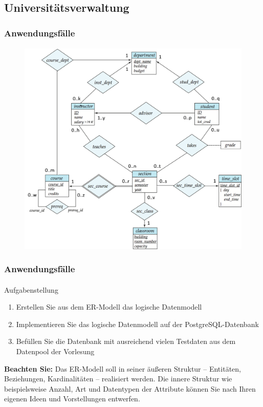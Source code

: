 \subsection*{Universit\"atsverwaltung}

\begin{frame}[t]
\frametitle{Anwendungsf\"alle}
\framesubtitle{\insertsubsection}
\begin{figure}
	\includegraphics[scale=0.35]{img/ERM-UniversityUseCase.png}
\end{figure}
\end{frame}

\begin{frame}[t]
\frametitle{Anwendungsf\"alle}
\framesubtitle{\insertsubsection}
\begin{alertblock}{Aufgabenstellung}
\begin{enumerate}
	\item Erstellen Sie aus dem ER-Modell das logische Datenmodell 
	\item Implementieren Sie das logische Datenmodell auf der PostgreSQL-Datenbank 
	\item Befüllen Sie die Datenbank mit ausreichend vielen Testdaten aus dem Datenpool der Vorlesung
\end{enumerate}
\end{alertblock}
\abs
\abs
\textbf{Beachten Sie:} Das ER-Modell soll in seiner \"au\ss eren Struktur -- Entit\"aten, Beziehungen, Kardinalit\"aten -- realisiert 
werden. Die innere Struktur wie beispielsweise Anzahl, Art und Datentypen der Attribute k\"onnen Sie nach Ihren eigenen Ideen und
Vorstellungen entwerfen.
\end{frame}

